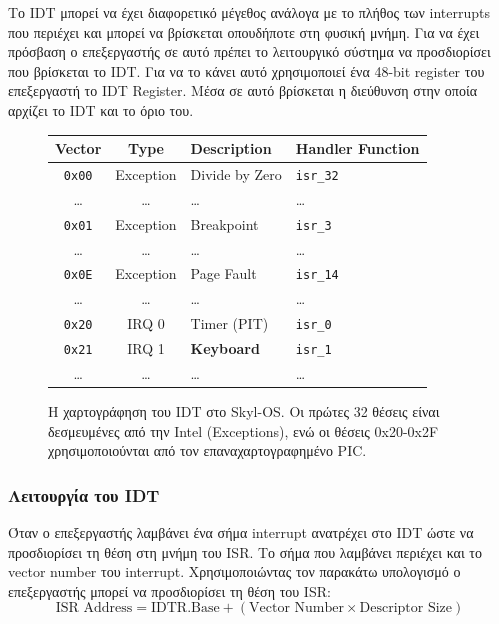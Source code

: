 \documentclass[18pt]{extarticle}
\begin{document}
Το IDT μπορεί να έχει διαφορετικό μέγεθος ανάλογα με το πλήθος των interrupts που περιέχει και μπορεί να βρίσκεται οπουδήποτε στη φυσική
μνήμη. Για να έχει πρόσβαση ο επεξεργαστής σε αυτό πρέπει το λειτουργικό σύστημα να προσδιορίσει που βρίσκεται το IDT. Για να το κάνει
αυτό χρησιμοποιεί ένα 48-bit register του επεξεργαστή το IDT Register. Μέσα σε αυτό βρίσκεται η διεύθυνση στην οποία αρχίζει το IDT και
το όριο του.

\begin{figure}[H]
    \centering
    \begin{tabular}{|c|c|l|l|}
        \hline
        \textbf{Vector} & \textbf{Type} & \textbf{Description} & \textbf{Handler Function} \\
        \hline
        \texttt{0x00} & Exception & Divide by Zero & \texttt{isr\_32} \\
        \hline
        \dots & \dots & \dots & \dots \\
        \hline
        \texttt{0x01} & Exception & Breakpoint & \texttt{isr\_3} \\
        \hline
        \dots & \dots & \dots & \dots \\
        \hline
        \texttt{0x0E} & Exception & Page Fault & \texttt{isr\_14} \\
        \hline
        \dots & \dots & \dots & \dots \\
        \hline
        \texttt{0x20} & IRQ 0 & Timer (PIT) & \texttt{isr\_0} \\
        \hline
        \texttt{0x21} & IRQ 1 & \textbf{Keyboard} & \texttt{isr\_1} \\
        \hline
        \dots & \dots & \dots & \dots \\
        \hline
    \end{tabular}
    \caption{Η χαρτογράφηση του IDT στο Skyl-OS. Οι πρώτες 32 θέσεις είναι δεσμευμένες από την Intel (Exceptions), ενώ οι θέσεις 0x20-0x2F χρησιμοποιούνται από τον επαναχαρτογραφημένο PIC.}
    \label{fig:idt_map}
\end{figure}

\subsubsection{Λειτουργία του IDT}

Όταν ο επεξεργαστής λαμβάνει ένα σήμα interrupt ανατρέχει στο IDT ώστε να προσδιορίσει τη θέση στη μνήμη του ISR. Το σήμα που λαμβάνει
περιέχει και το vector number του interrupt. Χρησιμοποιώντας τον παρακάτω υπολογισμό ο επεξεργαστής μπορεί να προσδιορίσει τη θέση του
ISR: $$\text{ISR Address} = \text{IDTR.Base} + (\text{Vector Number} \times \text{Descriptor Size})$$
\end{document}
